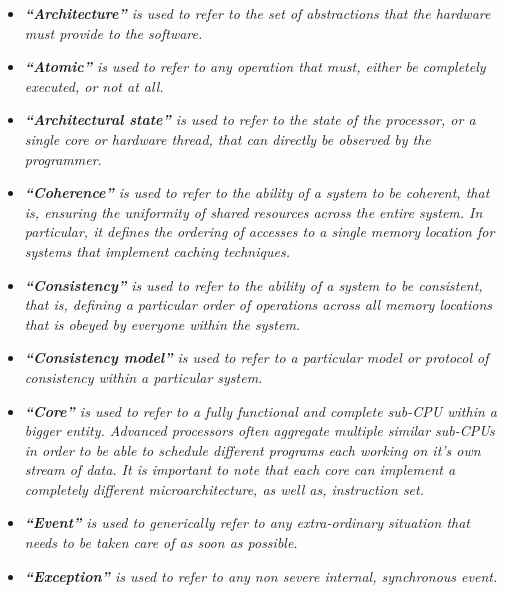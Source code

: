         \begin{itemize}

            \item \textit{\textbf{``Architecture''} is used to refer to the set of abstractions that the hardware must provide to the software.}

            \item \textit{\textbf{``Atomic''} is used to refer to any operation that must, either be completely executed, or not at all.}

            \item \textit{\textbf{``Architectural state''} is used to refer to the state of the processor, or a single core or hardware thread, that can directly be observed by the programmer.}

            \item \textit{\textbf{``Coherence''} is used to refer to the ability of a system to be coherent, that is, ensuring the uniformity of shared resources across the entire system. In particular, it defines the ordering of accesses to a single memory location for systems that implement caching techniques.}

            \item \textit{\textbf{``Consistency''} is used to refer to the ability of a system to be consistent, that is, defining a particular order of operations across all memory locations that is obeyed by everyone within the system.}

            \item \textit{\textbf{``Consistency model''} is used to refer to a particular model or protocol of consistency within a particular system.}

            \item \textit{\textbf{``Core''} is used to refer to a fully functional and complete sub-CPU within a bigger entity. Advanced processors often aggregate multiple similar sub-CPUs in order to be able to schedule different programs each working on it's own stream of data. It is important to note that each core can implement a completely different microarchitecture, as well as, instruction set.}

            \item \textit{\textbf{``Event''} is used to generically refer to any extra-ordinary situation that needs to be taken care of as soon as possible.}

            \item \textit{\textbf{``Exception''} is used to refer to any non severe internal, synchronous event.}


\end{itemize}
